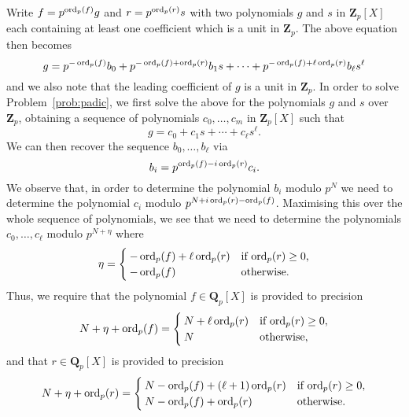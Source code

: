 Write $f = p^{\operatorname{ord}_p(f)} g$ and $r = p^{\operatorname{ord}_p(r)} s$ 
with two polynomials $g$ and $s$ in $\mathbf{Z}_p[X]$ 
each containing at least one coefficient which is a unit 
in $\mathbf{Z}_p$.  The above equation then becomes
\begin{equation}
g = p^{-\operatorname{ord}_p(f)} b_0 + p^{-\operatorname{ord}_p(f) + \operatorname{ord}_p(r)} b_1 s + \dotsb + p^{-\operatorname{ord}_p(f) + \ell \operatorname{ord}_p(r)} b_{\ell} s^{\ell}
\end{equation}
and we also note that the leading coefficient of $g$ 
is a unit in $\mathbf{Z}_p$.
In order to solve Problem~\ref{prob:padic}, we first solve the above 
for the polynomials $g$ and $s$ over $\mathbf{Z}_p$, obtaining a 
sequence of polynomials $c_0, \dotsc, c_m$ in $\mathbf{Z}_p[X]$ 
such that 
\begin{equation}
g = c_0 + c_1 s + \dotsb + c_{\ell} s^{\ell}.
\end{equation}
We can then recover the sequence $b_0, \dotsc, b_{\ell}$ via 
\begin{equation}
b_i = p^{\operatorname{ord}_p(f) - i \operatorname{ord}_p(r)} c_i.
\end{equation}
We observe that, in order to determine the polynomial $b_i$ 
modulo $p^N$ we need to determine the polynomial $c_i$ 
modulo $p^{N + i \operatorname{ord}_p(r) - \operatorname{ord}_p(f)}$.  Maximising this 
over the whole sequence of polynomials, we see that we need 
to determine the polynomials $c_0, \dotsc, c_{\ell}$ modulo 
$p^{N + \eta}$ where
\begin{equation}
\eta = \begin{cases}
       - \operatorname{ord}_p(f) + \ell \operatorname{ord}_p(r) & \text{if $\operatorname{ord}_p(r) \geq 0$,} \\
       - \operatorname{ord}_p(f)                  & \text{otherwise}.
       \end{cases}
\end{equation}
Thus, we require that the polynomial $f \in \mathbf{Q}_p[X]$ 
is provided to precision 
\begin{equation}
N + \eta + \operatorname{ord}_p(f) = \begin{cases}
                       N + \ell \operatorname{ord}_p(r) & \text{if $\operatorname{ord}_p(r) \geq 0$}, \\
                       N                  & \text{otherwise},
                       \end{cases}
\end{equation}
and that $r \in \mathbf{Q}_p[X]$ is provided to precision 
\begin{equation}
N + \eta + \operatorname{ord}_p(r) = \begin{cases}
                       N - \operatorname{ord}_p(f) + (\ell+1) \operatorname{ord}_p(r) & \text{if $\operatorname{ord}_p(r) \geq 0$}, \\
                       N - \operatorname{ord}_p(f) + \operatorname{ord}_p(r)          & \text{otherwise}.
                       \end{cases}
\end{equation}

